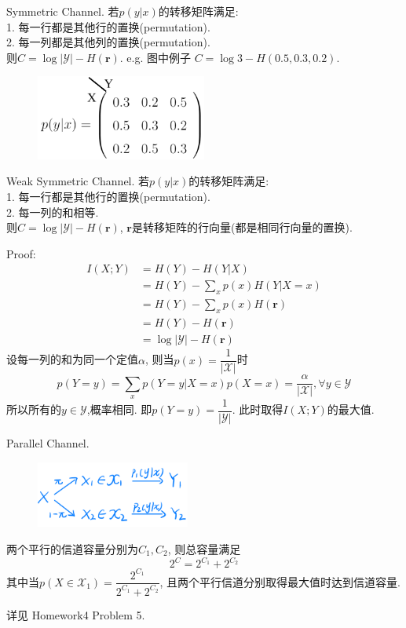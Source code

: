 \begin{example}
Symmetric Channel. 若$p(y|x)$的转移矩阵满足: \\
1. 每一行都是其他行的置换(permutation). \\
2. 每一列都是其他列的置换(permutation). \\
则$C=\log\left|\mathcal{Y}\right|-H\left(\mathbf{r}\right)$. e.g. 图中例子 $C=\log 3-H\left(0.5,0.3,0.2\right)$.
\begin{figure}[htbp]
    \centering
    \includegraphics[width=0.5\textwidth]{./figures/chapter5/symmetric.png}
\end{figure}

Weak Symmetric Channel. 若$p(y|x)$的转移矩阵满足: \\
1. 每一行都是其他行的置换(permutation). \\
2. 每一列的和相等. \\
则$C=\log\left|\mathcal{Y}\right|-H\left(\mathbf{r}\right)$, $\mathbf{r}$是转移矩阵的行向量(都是相同行向量的置换).

Proof:
\begin{align*}
I(X;Y) &= H(Y)-H(Y|X) \\
&= H(Y)-\sum_{x}p(x)H(Y|X=x) \\
&= H(Y)-\sum_{x}p(x)H\left(\mathbf{r}\right) \\
&= H(Y)-H\left(\mathbf{r}\right) \\
&= \log\left|\mathcal{Y}\right|-H\left(\mathbf{r}\right)
\end{align*}
设每一列的和为同一个定值$\alpha$, 则当$p(x)=\dfrac{1}{\left|\mathcal{X}\right|}$时
$$p(Y=y)=\sum\limits_xp(Y=y|X=x)p(X=x)=\dfrac{\alpha}{\left|\mathcal{X}\right|}, \forall y\in\mathcal{Y}$$
所以所有的$y\in\mathcal{Y}$,概率相同. 即$p(Y=y)=\dfrac{1}{\left|\mathcal{Y}\right|}$. 此时取得$I(X;Y)$的最大值.
\end{example}


\begin{example}
Parallel Channel.
\begin{figure}[htbp]
    \centering
    \includegraphics[width=0.45\textwidth]{./figures/chapter5/parallel.png}
\end{figure}

两个平行的信道容量分别为$C_1,C_2$, 则总容量满足
$$2^C=2^{C_1}+2^{C_2}$$
其中当$p(X\in\mathcal{X}_1)=\dfrac{2^{C_1}}{2^{C_1}+2^{C_2}}$, 且两个平行信道分别取得最大值时达到信道容量.

详见 Homework4 Problem 5.
\end{example}

